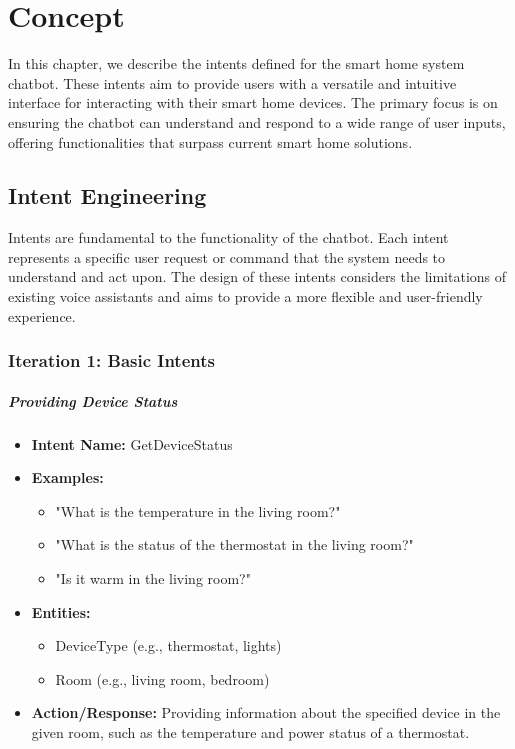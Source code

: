 
\chapter{Concept}
\label{chap:concept}

In this chapter, we describe the intents defined for the smart home system chatbot. These intents aim to provide users with a versatile and intuitive interface for interacting with their smart home devices. The primary focus is on ensuring the chatbot can understand and respond to a wide range of user inputs, offering functionalities that surpass current smart home solutions.

\section{Intent Engineering}

Intents are fundamental to the functionality of the chatbot. Each intent represents a specific user request or command that the system needs to understand and act upon. The design of these intents considers the limitations of existing voice assistants and aims to provide a more flexible and user-friendly experience.

\subsection{Iteration 1: Basic Intents}

\paragraph{Providing Device Status}

\begin{itemize}
    \item \textbf{Intent Name:} GetDeviceStatus
    \item \textbf{Examples:}
    \begin{itemize}
        \item "What is the temperature in the living room?"
        \item "What is the status of the thermostat in the living room?"
        \item "Is it warm in the living room?"
    \end{itemize}
    \item \textbf{Entities:}
    \begin{itemize}
        \item DeviceType (e.g., thermostat, lights)
        \item Room (e.g., living room, bedroom)
    \end{itemize}
    \item \textbf{Action/Response:} Providing information about the specified device in the given room, such as the temperature and power status of a thermostat.
\end{itemize}

